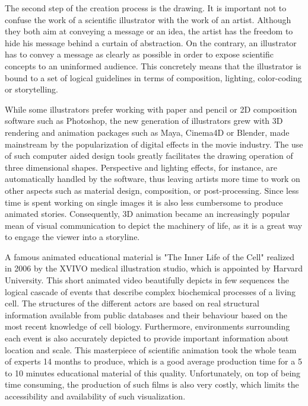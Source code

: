 The second step of the creation process is the drawing. 
It is important not to confuse the work of a scientific illustrator with the work of an artist.
Although they both aim at conveying a message or an idea, the artist has the freedom to hide his message behind a curtain of abstraction.
On the contrary, an illustrator has to convey a message as clearly as possible in order to expose scientific concepts to an uninformed audience.
This concretely means that the illustrator is bound to a set of logical guidelines in terms of composition, lighting, color-coding or storytelling.

While some illustrators prefer working with paper and pencil or 2D composition software such as Photoshop, the new generation of illustrators grew with 3D rendering and animation packages such as Maya, Cinema4D or Blender, made mainstream by the popularization of digital effects in the movie industry.
The use of such computer aided design tools greatly facilitates the drawing operation of three dimensional shapes.
Perspective and lighting effects, for instance, are automatically handled by the software, thus leaving artists more time to work on other aspects such as material design, composition, or post-processing.
Since less time is spent working on single images it is also less cumbersome to produce animated stories.
Consequently, 3D animation became an increasingly popular mean of visual communication to depict the machinery of life, as it is a great way to engage the viewer into a storyline.

A famous animated educational material is "The Inner Life of the Cell" \cite{inner2006} realized in 2006 by the XVIVO medical illustration studio, which is appointed by Harvard University.
This short animated video beautifully depicts in few sequences the logical cascade of events that describe complex biochemical processes of a living cell.
The structures of the different actors are based on real structural information available from public databases and their behaviour based on the most recent knowledge of cell biology.
Furthermore, environments surrounding each event is also accurately depicted to provide important information about location and scale.
This masterpiece of scientific animation took the whole team of experts 14 months to produce, which is a good average production time for a 5 to 10 minutes educational material of this quality.
Unfortunately, on top of being time consuming, the production of such films is also very costly, which limits the accessibility and availability of such visualization.

